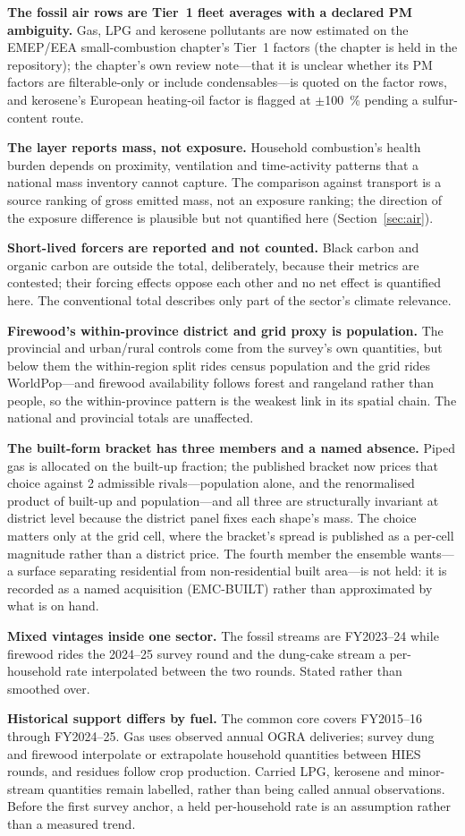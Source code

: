 \textbf{The fossil air rows are Tier~1 fleet averages with a declared PM ambiguity.} Gas,
LPG and kerosene pollutants are now estimated on the EMEP/EEA small-combustion chapter's
Tier~1 factors (the chapter is held in the repository);
the chapter's own review note---that it is unclear whether its PM factors are
filterable-only or include condensables---is quoted on the factor rows, and kerosene's
European heating-oil \SOtwo{} factor is flagged at $\pm$\SI{100}{\percent} pending a
sulfur-content route.

\textbf{The layer reports mass, not exposure.} Household combustion's health burden depends on
proximity, ventilation and time-activity patterns that a national mass inventory cannot
capture. The comparison against transport is a source ranking of gross emitted mass, not an
exposure ranking; the direction of the exposure difference is plausible but not quantified
here (Section~\ref{sec:air}).

\textbf{Short-lived forcers are reported and not counted.} Black carbon and organic
carbon are outside the \COe{} total, deliberately, because their metrics are contested;
their forcing effects oppose each other and no net effect is quantified here. The
conventional total describes only part of the sector's climate relevance.

\textbf{Firewood's within-province district and grid proxy is population.} The provincial
and urban/rural controls come from the survey's own quantities, but below them the
within-region split rides census population and the grid rides WorldPop---and firewood
availability follows forest and rangeland rather than people, so the within-province
pattern is the weakest link in its spatial chain. The national and provincial totals are
unaffected.

\textbf{The built-form bracket has three members and a named absence.} Piped gas is
allocated on the built-up fraction; the published bracket now prices that choice against
\num{2} admissible rivals---population alone, and the renormalised product of built-up and
population---and all three are structurally invariant at district level because the
district panel fixes each shape's mass. The choice matters only at the grid cell, where
the bracket's spread is published as a per-cell magnitude rather than a district price.
The fourth member the ensemble wants---a surface separating residential from
non-residential built area---is not held: it is recorded as a named acquisition
(EMC-BUILT) rather than approximated by what is on hand.

\textbf{Mixed vintages inside one sector.} The fossil streams are FY2023--24 while
firewood rides the 2024--25 survey round and the dung-cake stream a per-household rate
interpolated between the two rounds. Stated rather than smoothed over.

\textbf{Historical support differs by fuel.} The common core covers FY2015--16 through FY2024--25. Gas uses observed annual OGRA deliveries; survey dung and firewood interpolate or extrapolate household quantities between HIES rounds, and residues follow crop production. Carried LPG, kerosene and minor-stream quantities remain labelled, rather than being called annual observations. Before the first survey anchor, a held per-household rate is an assumption rather than a measured trend.
